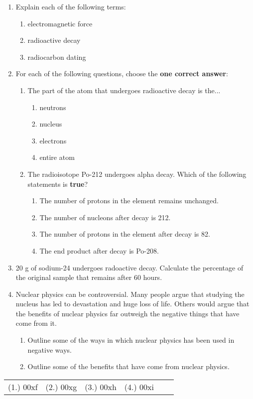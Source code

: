 \begin{eocexercises}{}

\begin{enumerate}
\item{Explain each of the following terms:}
\begin{enumerate}
\item{electromagnetic force}
\item{radioactive decay}
\item{radiocarbon dating}
\end{enumerate}

\item{For each of the following questions, choose the \textbf{one correct answer}:}

\begin{enumerate}
\item{The part of the atom that undergoes radioactive decay is the...
\begin{enumerate}
\item{neutrons}
\item{nucleus}
\item{electrons}
\item{entire atom}
\end{enumerate}
}
\item{The radioisotope Po-212 undergoes alpha decay. Which of the following statements is \textbf{true}?
\begin{enumerate}
\item{The number of protons in the element remains unchanged.}
\item{The number of nucleons after decay is 212.}
\item{The number of protons in the element after decay is 82.}
\item{The end product after decay is Po-208.}
\end{enumerate}
}
\end{enumerate}


\item{20 g of sodium-24 undergoes radoactive decay. Calculate the percentage of the original sample that remains after 60 hours.}

\item{Nuclear physics can be controversial. Many people argue that studying the nucleus has led to devastation and huge loss of life. Others would argue that the benefits of nuclear physics far outweigh the negative things that have come from it.}
\begin{enumerate}
\item{Outline some of the ways in which nuclear physics has been used in negative ways.}
\item{Outline some of the benefits that have come from nuclear physics.}
\end{enumerate}
\end{enumerate}

\practiceinfo

\begin{tabular}[h]{cccccc}
(1.) 00xf & (2.) 00xg & (3.) 00xh & (4.) 00xi & 
 \end{tabular}
\end{eocexercises}









